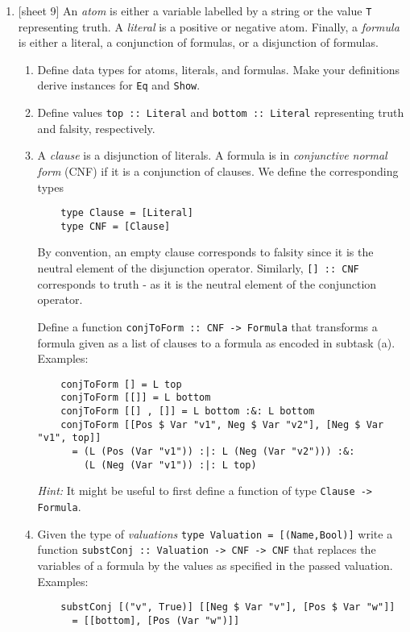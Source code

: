 \documentclass{article}
\def\code#1{\texttt{#1}}
\begin{document}
\begin{enumerate}
    \item {[sheet 9]} An \textit{atom} is either a variable labelled by a string or the value \code{T} representing truth. A \textit{literal} is a positive or negative atom. Finally, a \textit{formula} is either a literal, a conjunction of formulas, or a disjunction of formulas.
        \begin{enumerate}
            \item Define data types for atoms, literals, and formulas. Make your definitions derive instances for \code{Eq} and \code{Show}.
            \item Define values \code{top :: Literal} and \code{bottom :: Literal} representing truth and falsity, respectively.
            \item A \textit{clause} is a disjunction of literals. A formula is in \textit{conjunctive normal form} (CNF) if it is a conjunction of clauses. We define the corresponding types
                \begin{verbatim}
    type Clause = [Literal]
    type CNF = [Clause]
                \end{verbatim}
                By convention, an empty clause corresponds to falsity since it is the neutral element of the disjunction operator. Similarly, \code{[] :: CNF} corresponds to truth - as it is the neutral element of the conjunction operator. \par
                Define a function \code{conjToForm :: CNF -> Formula} that transforms a formula given as a list of clauses to a formula as encoded in subtask (a). Examples:
                \begin{verbatim}
    conjToForm [] = L top
    conjToForm [[]] = L bottom
    conjToForm [[] , []] = L bottom :&: L bottom
    conjToForm [[Pos $ Var "v1", Neg $ Var "v2"], [Neg $ Var "v1", top]]
      = (L (Pos (Var "v1")) :|: L (Neg (Var "v2"))) :&:
        (L (Neg (Var "v1")) :|: L top)
                \end{verbatim}
                \textit{Hint:} It might be useful to first define a function of type \code{Clause -> Formula}.
            \item Given the type of \textit{valuations} \code{type Valuation = [(Name,Bool)]} write a function \code{substConj :: Valuation -> CNF -> CNF} that replaces the variables of a formula by the values as specified in the passed valuation. Examples:
                \begin{verbatim}
    substConj [("v", True)] [[Neg $ Var "v"], [Pos $ Var "w"]]
      = [[bottom], [Pos (Var "w")]]

\end{verbatim}
\end{enumerate}
\end{enumerate}
\end{document}
